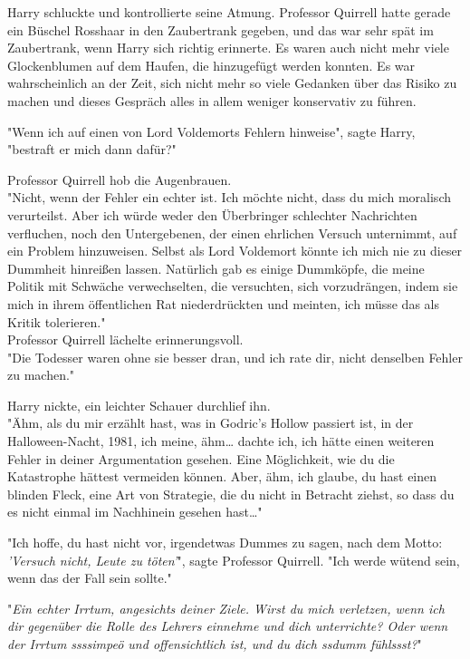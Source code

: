 {Harry schluckte und kontrollierte seine Atmung. Professor Quirrell hatte gerade ein Büschel Rosshaar in den Zaubertrank gegeben, und das war sehr spät im Zaubertrank, wenn Harry sich richtig erinnerte. Es waren auch nicht mehr viele Glockenblumen auf dem Haufen, die hinzugefügt werden konnten. Es war wahrscheinlich an der Zeit, sich nicht mehr so viele Gedanken über das Risiko zu machen und dieses Gespräch alles in allem weniger konservativ zu führen.

"Wenn ich auf einen von Lord Voldemorts Fehlern hinweise", sagte Harry, "bestraft er mich dann dafür?"

Professor Quirrell hob die Augenbrauen.\\ "Nicht, wenn der Fehler ein echter ist. Ich möchte nicht, dass du mich moralisch verurteilst. Aber ich würde weder den Überbringer schlechter Nachrichten verfluchen, noch den Untergebenen, der einen ehrlichen Versuch unternimmt, auf ein Problem hinzuweisen. Selbst als Lord Voldemort könnte ich mich nie zu dieser Dummheit hinreißen lassen. Natürlich gab es einige Dummköpfe, die meine Politik mit Schwäche verwechselten, die versuchten, sich vorzudrängen, indem sie mich in ihrem öffentlichen Rat niederdrückten und meinten, ich müsse das als Kritik tolerieren."\\ Professor Quirrell lächelte erinnerungsvoll.\\ "Die Todesser waren ohne sie besser dran, und ich rate dir, nicht denselben Fehler zu machen."

Harry nickte, ein leichter Schauer durchlief ihn.\\ "Ähm, als du mir erzählt hast, was in Godric's Hollow passiert ist, in der Halloween-Nacht, 1981, ich meine, ähm… dachte ich, ich hätte einen weiteren Fehler in deiner Argumentation gesehen. Eine Möglichkeit, wie du die Katastrophe hättest vermeiden können. Aber, ähm, ich glaube, du hast einen blinden Fleck, eine Art von Strategie, die du nicht in Betracht ziehst, so dass du es nicht einmal im Nachhinein gesehen hast…"

"Ich hoffe, du hast nicht vor, irgendetwas Dummes zu sagen, nach dem Motto: \emph{'Versuch nicht, Leute zu töten'}", sagte Professor Quirrell. "Ich werde wütend sein, wenn das der Fall sein sollte."

"\emph{Ein echter Irrtum, angesichts deiner Ziele. Wirst du mich verletzen, wenn ich dir gegenüber die Rolle des Lehrers einnehme und dich unterrichte? Oder wenn der Irrtum ssssimpeö und offensichtlich ist, und du dich ssdumm fühlssst?}"

}
